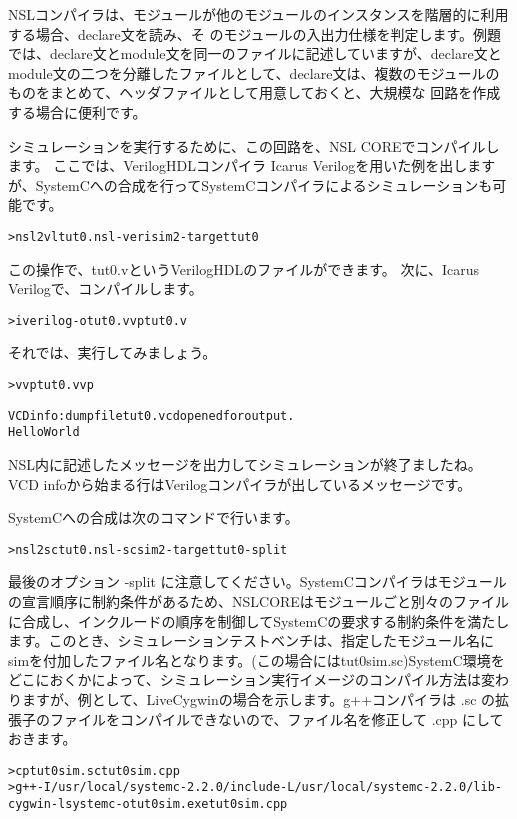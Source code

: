 NSLコンパイラは、モジュールが他のモジュールのインスタンスを階層的に利用する場合、declare文を読み、そ のモジュールの入出力仕様を判定します。例題では、declare文とmodule文を同一のファイルに記述していますが、declare文と module文の二つを分離したファイルとして、declare文は、複数のモジュールのものをまとめて、ヘッダファイルとして用意しておくと、大規模な 回路を作成する場合に便利です。

シミュレーションを実行するために、この回路を、NSL COREでコンパイルします。
ここでは、VerilogHDLコンパイラ Icarus Verilogを用いた例を出しますが、SystemCへの合成を行ってSystemCコンパイラによるシミュレーションも可能です。

\begin{reviewcmd}
\begin{alltt}
\textgreater{} nsl2vl tut0.nsl -verisim2 -target tut0
\end{alltt}
\end{reviewcmd}

この操作で、tut0.vというVerilogHDLのファイルができます。
次に、Icarus Verilogで、コンパイルします。

\begin{reviewcmd}
\begin{alltt}
\textgreater{} iverilog -o tut0.vvp tut0.v
\end{alltt}
\end{reviewcmd}

それでは、実行してみましょう。

\begin{reviewcmd}
\begin{alltt}
\textgreater{} vvp tut0.vvp

VCD info: dumpfile tut0.vcd opened for output.
Hello World
\end{alltt}
\end{reviewcmd}

NSL内に記述したメッセージを出力してシミュレーションが終了ましたね。VCD infoから始まる行はVerilogコンパイラが出しているメッセージです。

SystemCへの合成は次のコマンドで行います。

\begin{reviewcmd}
\begin{alltt}
\textgreater{} nsl2sc tut0.nsl -scsim2 -target tut0 -split
\end{alltt}
\end{reviewcmd}

最後のオプション -split に注意してください。SystemCコンパイラはモジュールの宣言順序に制約条件があるため、NSLCOREはモジュールごと別々のファイルに合成し、インクルードの順序を制御してSystemCの要求する制約条件を満たします。このとき、シミュレーションテストベンチは、指定したモジュール名に\textunderscore{}simを付加したファイル名となります。(この場合にはtut0\textunderscore{}sim.sc)SystemC環境をどこにおくかによって、シミュレーション実行イメージのコンパイル方法は変わりますが、例として、LiveCygwinの場合を示します。g++コンパイラは .sc の拡張子のファイルをコンパイルできないので、ファイル名を修正して .cpp にしておきます。

\begin{reviewcmd}
\begin{alltt}
\textgreater{} cp tut0\textunderscore{}sim.sc tut0\textunderscore{}sim.cpp
\textgreater{} g++ -I/usr/local/systemc-2.2.0/include -L/usr/local/systemc-2.2.0/lib-cygwin -lsystemc -o  tut0\textunderscore{}sim.exe tut0\textunderscore{}sim.cpp
\end{alltt}
\end{reviewcmd}
